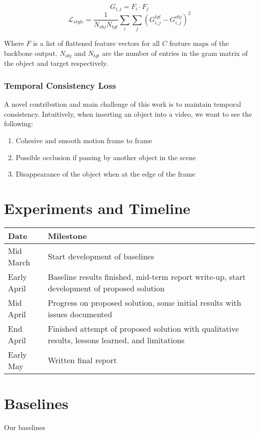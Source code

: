 \documentclass{article}
\begin{document}
$$G_{i, j} = F_i \cdot F_j$$
$$\mathcal{L}_{style} = \frac{1}{N_{obj} N_{tgt}} \sum_i \sum_j (G_{i, j}^{tgt} - G_{i, j}^{obj})^2$$

Where $F$ is a list of flattened feature vectors for all $C$ feature maps of the backbone output. $N_{obj}$ and $N_{tgt}$ are the number of entries in the gram matrix of the object and target respectively.

\subsubsection{Temporal Consistency Loss}
A novel contribution and main challenge of this work is to maintain temporal consistency. Intuitively, when inserting an object into a video, we want to see the following:

\begin{enumerate}
    \item Cohesive and smooth motion frame to frame
    \item Possible occlusion if passing by another object in the scene
    \item Disappearance of the object when at the edge of the frame
\end{enumerate}

\section{Experiments and Timeline}
\begin{center}
\begin{tabular}{|| p{2cm} | p{12cm} ||}
    \hline
    \textbf{Date} & \textbf{Milestone} \\
    \hline
    Mid March & Start development of baselines \\
    \hline
    Early April & Baseline results finished, mid-term report write-up, start development of proposed solution \\
    \hline
    Mid April & Progress on proposed solution, some initial results with issues documented \\
    \hline
    End April & Finished attempt of proposed solution with qualitative results, lessons learned, and limitations\\
    \hline
    Early May & Written final report \\
    \hline
\end{tabular}
\end{center}

\section{Baselines}
Our baselines 
\end{document}
